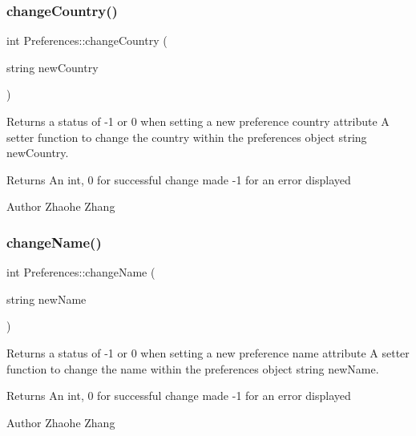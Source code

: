 \subsubsection{\texorpdfstring{change\+Country()}{changeCountry()}}
{\footnotesize\ttfamily int Preferences\+::change\+Country (\begin{DoxyParamCaption}\item[{string}]{new\+Country }\end{DoxyParamCaption})}



Returns a status of -\/1 or 0 when setting a new preference country attribute  A setter function to change the country within the preferences object  string new\+Country. 

\begin{DoxyReturn}{Returns}
An int, 0 for successful change made -\/1 for an error displayed 
\end{DoxyReturn}
\begin{DoxyAuthor}{Author}
Zhaohe Zhang 
\end{DoxyAuthor}
\mbox{\label{class_preferences_a350314fc1089f808411030293063225a}} 
\subsubsection{\texorpdfstring{change\+Name()}{changeName()}}
{\footnotesize\ttfamily int Preferences\+::change\+Name (\begin{DoxyParamCaption}\item[{string}]{new\+Name }\end{DoxyParamCaption})}



Returns a status of -\/1 or 0 when setting a new preference name attribute  A setter function to change the name within the preferences object  string new\+Name. 

\begin{DoxyReturn}{Returns}
An int, 0 for successful change made -\/1 for an error displayed 
\end{DoxyReturn}
\begin{DoxyAuthor}{Author}
Zhaohe Zhang 
\end{DoxyAuthor}
\mbox{\label{class_preferences_a2a14e274fd369d3d36793170f62458cb}} 
